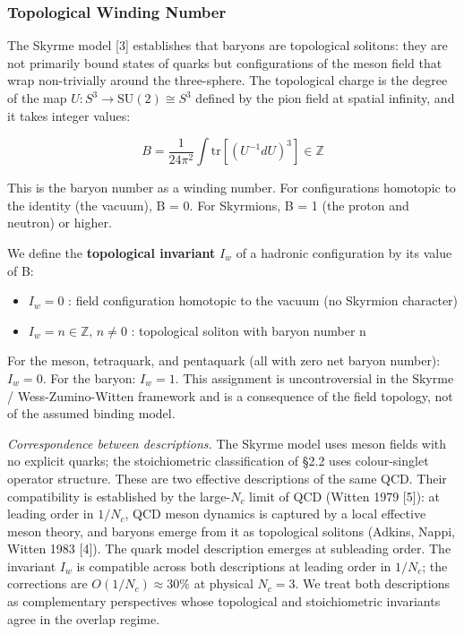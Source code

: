 \hypertarget{topological-winding-number}{%
\subsubsection{Topological Winding
Number}\label{topological-winding-number}}

The Skyrme model {[}3{]} establishes that baryons are topological
solitons: they are not primarily bound states of quarks but
configurations of the meson field that wrap non-trivially around the
three-sphere. The topological charge is the degree of the map
\(U : S^3 \to \mathrm{SU}(2) \cong S^3\) defined by the pion field at
spatial infinity, and it takes integer values:

\[B = \frac{1}{24\pi^2} \int \mathrm{tr}\left[ (U^{-1} dU)^3 \right] \in \mathbb{Z}\]

This is the baryon number as a winding number. For configurations
homotopic to the identity (the vacuum), B = 0. For Skyrmions, B = 1 (the
proton and neutron) or higher.

We define the \textbf{topological invariant} \(I_w\) of a hadronic
configuration by its value of B:

\begin{itemize}
\tightlist
\item
  \(I_w = 0\) : field configuration homotopic to the vacuum (no Skyrmion
  character)
\item
  \(I_w = n \in \mathbb{Z},\, n \neq 0\) : topological soliton with
  baryon number n
\end{itemize}

For the meson, tetraquark, and pentaquark (all with zero net baryon
number): \(I_w = 0\). For the baryon: \(I_w = 1\). This assignment is
uncontroversial in the Skyrme / Wess-Zumino-Witten framework and is a
consequence of the field topology, not of the assumed binding model.

\emph{Correspondence between descriptions.} The Skyrme model uses meson
fields with no explicit quarks; the stoichiometric classification of
§2.2 uses colour-singlet operator structure. These are two effective
descriptions of the same QCD. Their compatibility is established by the
large-\(N_c\) limit of QCD (Witten 1979 {[}5{]}): at leading order in
\(1/N_c\), QCD meson dynamics is captured by a local effective meson
theory, and baryons emerge from it as topological solitons (Adkins,
Nappi, Witten 1983 {[}4{]}). The quark model description emerges at
subleading order. The invariant \(I_w\) is compatible across both
descriptions at leading order in \(1/N_c\); the corrections are
\(O(1/N_c) \approx 30\%\) at physical \(N_c = 3\). We treat both
descriptions as complementary perspectives whose topological and
stoichiometric invariants agree in the overlap regime.


